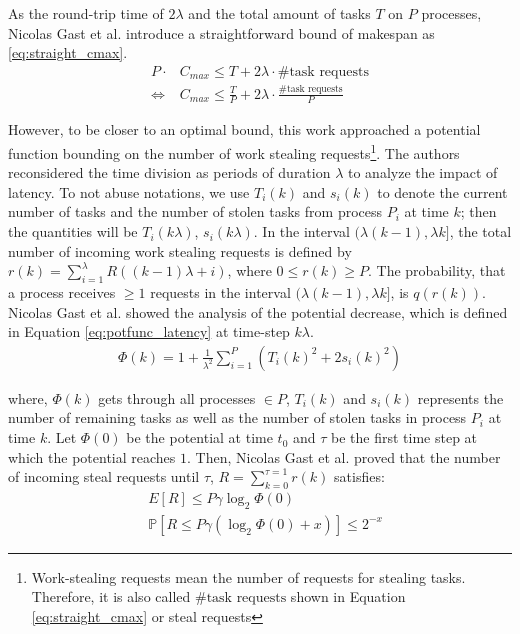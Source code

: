 As the round-trip time of $2\lambda$ and the total amount of tasks $T$ on $P$ processes, Nicolas Gast et al. introduce a straightforward bound of makespan as \ref{eq:straight_cmax}.
\begin{equation} \label{eq:straight_cmax}
\begin{split}
	P \cdot & C_{max} \leq T + 2\lambda \cdot \#{\textrm{task requests}} \\
	\Leftrightarrow \ & C_{max} \leq \frac{T}{P} + 2\lambda \cdot \frac{\#{\textrm{task requests}}}{P}
\end{split}
\end{equation}

However, to be closer to an optimal bound, this work \cite{gast2021analysis} approached a potential function bounding on the number of work stealing requests\footnote{Work-stealing requests mean the number of requests for stealing tasks. Therefore, it is also called $\#{\textrm{task requests}}$ shown in Equation \ref{eq:straight_cmax} or steal requests}. The authors reconsidered the time division as periods of duration $\lambda$ to analyze the impact of latency. To not abuse notations, we use $T_{i}(k)$ and $s_{i}(k)$ to denote the current number of tasks and the number of stolen tasks from process $P_{i}$ at time $k$; then the quantities will be $T_{i}(k\lambda)$, $s_{i}(k\lambda)$. In the interval $(\lambda (k-1), \lambda k]$, the total number of incoming work stealing requests is defined by $r(k) = \sum_{i=1}^{\lambda} R((k-1)\lambda + i)$, where $0 \leq r(k) \geq P$. The probability, that a process receives $\geq 1$ requests in the interval $(\lambda (k-1), \lambda k]$, is $q(r(k))$.\\

Nicolas Gast et al. \cite{gast2021analysis} showed the analysis of the potential decrease, which is defined in Equation \ref{eq:potfunc_latency} at time-step $k\lambda$.
\begin{equation} \label{eq:potfunc_latency}
\begin{split}
	\Phi(k) = 1 + \frac{1}{\lambda^2} \sum_{i=1}^{P} (T_{i}(k)^2 + 2s_{i}(k)^2)
\end{split}
\end{equation}

where, $\Phi(k)$ gets through all processes $\in P$, $T_{i}(k)$ and $s_{i}(k)$ represents the number of remaining tasks as well as the number of stolen tasks in process $P_{i}$ at time $k$. Let $\Phi(0)$ be the potential at time $t_{0}$ and $\tau$ be the first time step at which the potential reaches $1$. Then, Nicolas Gast et al. proved that the number of incoming steal requests until $\tau$, $R = \sum_{k=0}^{\tau = 1} r(k)$ satisfies:
\begin{equation} \label{eq:exp_prob_R_latency}
\begin{split}
	& E[R] \leq P \gamma \log_{2} \Phi(0) \\
	& \mathbb{P}[R \leq P \gamma (\log_{2} \Phi(0) + x)] \leq 2^{-x}
\end{split}
\end{equation}

